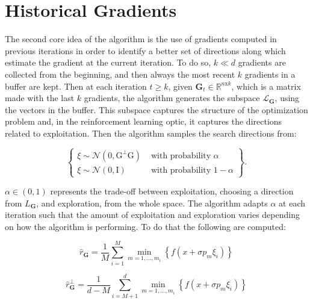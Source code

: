 
\section{Historical Gradients}\label{sect:2_2}

The second core idea of the algorithm is the use of gradients computed in previous iterations in order to identify a better set of directions along which estimate the gradient at the current iteration. To do so, $k\ll d$ gradients are collected from the beginning, and then always the most recent $k$ gradients in a buffer are kept. Then at each iteration $t \geq k$, given $\mathbf{G}_t\in \mathbb{R}^{n\text{x} k}$, which is a matrix made with the last $k$ gradients, the algorithm generates the subspace $\mathcal{L}_\mathbf{G}$, using the vectors in the buffer. This subspace captures the structure of the optimization problem and, in the reinforcement learning optic, it captures the directions related to exploitation.
Then the algorithm samples the search directions from:

\begin{equation}\label{historical sampling}
	\left\{\begin{array}{ll}\xi \sim \mathcal{N}\left(0, \mathrm{G}^{\perp} \mathrm{G}\right) & \text { with probability } \alpha \\ \xi \sim \mathcal{N}(0, \mathrm{I}) & \text { with probability } 1-\alpha\end{array}\right\}. 
\end{equation}

$\alpha\in\left( 0,1 \right)$ represents the trade-off between exploitation, choosing a direction from $L_\mathbf{G}$, and exploration, from the whole space. The algorithm adapts $\alpha$ at each iteration such that the amount of exploitation and exploration varies depending on how the algorithm is performing. To do that the following are computed:

\begin{equation}
	\widehat{r}_{\mathbf{G}}=\frac{1}{M} \sum_{i=1}^{M} \min_{m=1,\dots,m_i} \left\{ f\left( x+\sigma p_m \xi_i \right) \right\} 
\end{equation}

\begin{equation}
	\widehat{r}_{\mathbf{G}}^{\perp}=\frac{1}{d-M} \sum_{i=M+1}^{d} \min_{m=1,\dots,m_i} \left\{ f\left( x+\sigma p_m \xi_i \right) \right\} 
\end{equation}

